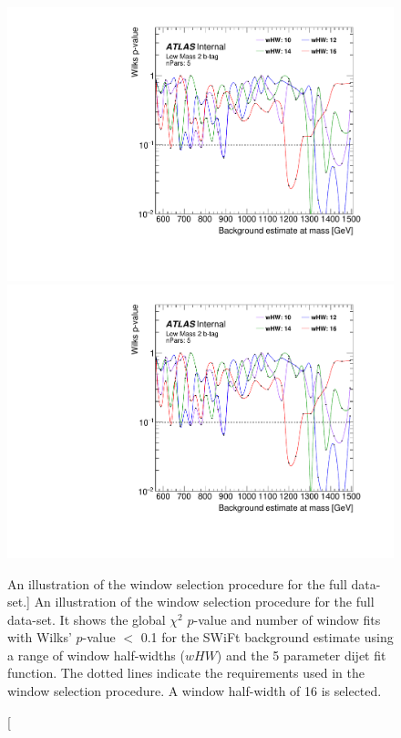 \begin{figure}[!htb]
\captionsetup[subfigure]{aboveskip=0pt,justification=centering}
\centering
{} {
  \includegraphics[width=0.45\linewidth, angle=0,page=6]{figs/Dibjet/LowMass/FitStudy_min566/windowSel_unblind.pdf}
}\hspace{-5mm}
 {
  \includegraphics[width=0.45\linewidth, angle=0,page=8]{figs/Dibjet/LowMass/FitStudy_min566/windowSel_unblind.pdf}
}
\vspace{2pt}
\caption
    [An illustration of the window selection procedure for the full \lm{} data-set.]
    {\label{fig:windowSel_unblind}
      An illustration of the window selection procedure for the full \lm{} data-set.
      It shows the global $\chi^{2}$ \mbox{$p$-value} and number of window fits with Wilks' \mbox{$p$-value} $<$ 0.1
      for the SWiFt background estimate using a range of window half-widths ($wHW$) and the 5 parameter dijet fit function.
      The dotted lines indicate the requirements used in the window selection procedure. A window half-width of 16 is selected.
    }
\end{figure}

